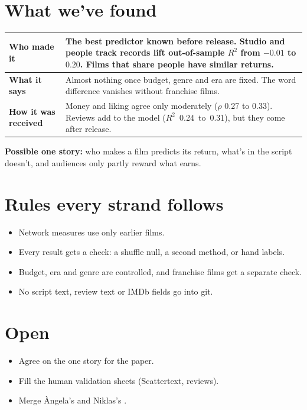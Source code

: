 \documentclass[10pt]{article}
\begin{document}
\section{What we've found}

\begin{tabularx}{\linewidth}{@{}>{\bfseries}p{3.2cm}L@{}}
\toprule
Who made it & The best predictor known before release. Studio and people track records lift out-of-sample $R^2$ from $-0.01$ to $0.20$. Films that share people have similar returns. \\
\midrule
What it says & Almost nothing once budget, genre and era are fixed. The word difference vanishes without franchise films. \\
\midrule
How it was received & Money and liking agree only moderately ($\rho$ 0.27 to 0.33). Reviews add to the model (\mbox{$R^2$ 0.24 to 0.31}), but they come after release. \\
\bottomrule
\end{tabularx}

\medskip
\textbf{Possible one story:} who makes a film predicts its return, what's in the script doesn't, and audiences
only partly reward what earns.

\section{Rules every strand follows}
\begin{itemize}
  \item Network measures use only earlier films.
  \item Every result gets a check: a shuffle null, a second method, or hand labels.
  \item Budget, era and genre are controlled, and franchise films get a separate check.
  \item No script text, review text or IMDb fields go into git.
\end{itemize}

\section{Open}
\begin{itemize}
  \item Agree on the one story for the paper.
  \item Fill the human validation sheets (Scattertext, reviews).
  \item Merge Àngela's  and Niklas's .
\end{itemize}
\end{document}
